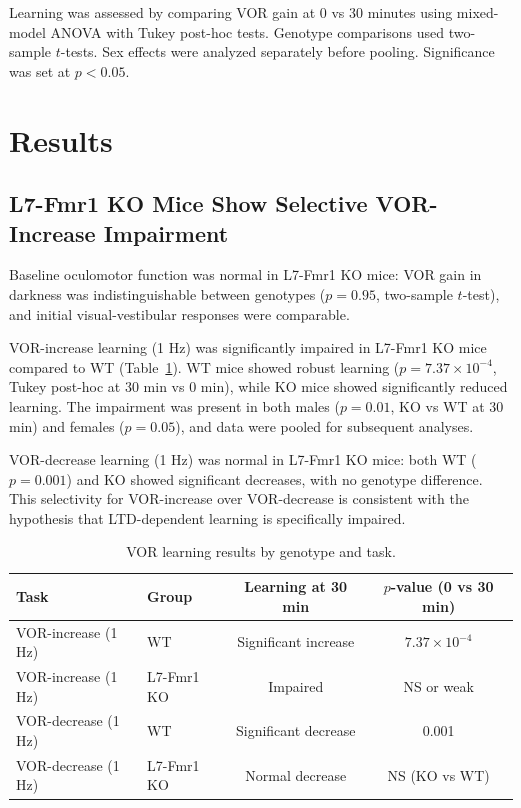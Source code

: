 \documentclass[11pt]{article}
\begin{document}
Learning was assessed by comparing VOR gain at 0 vs 30 minutes using mixed-model ANOVA with Tukey post-hoc tests. Genotype comparisons used two-sample $t$-tests. Sex effects were analyzed separately before pooling. Significance was set at $p < 0.05$.

\section{Results}

\subsection{L7-Fmr1 KO Mice Show Selective VOR-Increase Impairment}

Baseline oculomotor function was normal in L7-Fmr1 KO mice: VOR gain in darkness was indistinguishable between genotypes ($p = 0.95$, two-sample $t$-test), and initial visual-vestibular responses were comparable.

VOR-increase learning (1 Hz) was significantly impaired in L7-Fmr1 KO mice compared to WT (Table~\ref{tab:learning}). WT mice showed robust learning ($p = 7.37 \times 10^{-4}$, Tukey post-hoc at 30 min vs 0 min), while KO mice showed significantly reduced learning. The impairment was present in both males ($p = 0.01$, KO vs WT at 30 min) and females ($p = 0.05$), and data were pooled for subsequent analyses.

VOR-decrease learning (1 Hz) was normal in L7-Fmr1 KO mice: both WT ($p = 0.001$) and KO showed significant decreases, with no genotype difference. This selectivity for VOR-increase over VOR-decrease is consistent with the hypothesis that LTD-dependent learning is specifically impaired.

\begin{table}[h]
\centering
\caption{VOR learning results by genotype and task.}
\label{tab:learning}
\begin{tabular}{llcc}
\toprule
Task & Group & Learning at 30 min & $p$-value (0 vs 30 min) \\
\midrule
VOR-increase (1 Hz) & WT & Significant increase & $7.37 \times 10^{-4}$ \\
VOR-increase (1 Hz) & L7-Fmr1 KO & Impaired & NS or weak \\
VOR-decrease (1 Hz) & WT & Significant decrease & 0.001 \\
VOR-decrease (1 Hz) & L7-Fmr1 KO & Normal decrease & NS (KO vs WT) \\
\bottomrule
\end{tabular}
\end{table}
\end{document}
